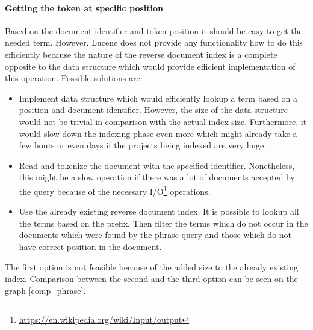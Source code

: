 \paragraph{Getting the token at specific position}
Based on the document identifier and token position it should be easy to get the needed term. However, Lucene does not
provide any functionality how to do this efficiently because the nature of the reverse document index is a complete
opposite to the data structure which would provide efficient implementation of this operation. Possible solutions are:
\begin{itemize}
    \item Implement data structure which would efficiently lookup a term based on a position and document identifier.
    However, the size of the data structure would not be trivial in comparison with the actual index size. Furthermore,
    it would slow down the indexing phase even more which might already take a few hours or even days if the projects
    being indexed are very huge.
    \item Read and tokenize the document with the specified identifier. Nonetheless, this might be a slow operation if there
    was a lot of documents accepted by the query because of the necessary
    I/O\footnote{\url{https://en.wikipedia.org/wiki/Input/output}} operations.
    \item Use the already existing reverse document index. It is possible to lookup all the terms based on the prefix.
    Then filter the terms which do not occur in the documents which were found by the phrase query and those which
    do not have correct position in the document.
\end{itemize}

The first option is not feasible because of the added size to the already existing index. Comparison between the
second and the third option can be seen on the graph \ref{comp_phrase}.

